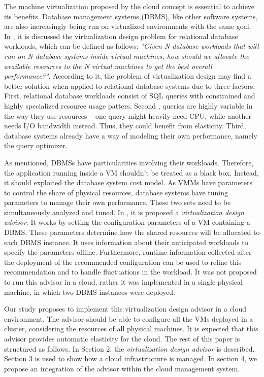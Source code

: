The machine virtualization proposed by the cloud concept is essential to achieve its benefits. Database management systems (DBMS), like other software systems, are also increasingly being run on virtualized environments with the same goal. In \cite{4401021}, it is discussed the virtualization design problem for relational database workloads, which can be defined as follows: \textit{"Given N database workloads that will run on N database systems inside virtual machines, how should we allocate the available resources to the N virtual machines to get the best overall performance?"}. According to it, the problem of virtualization design may find a better solution when applied to relational database systems due to three factors. First, relational database workloads consist of SQL queries with constrained and highly specialized resource usage patters. Second , queries are highly variable in the way they use resources -- one query might heavily need CPU, while another needs I/O bandwidth instead. Thus, they could benefit from elasticity. Third, database systems already have a way of modeling their own performance, namely the query optimizer.

As mentioned, DBMSs have particularities involving their workloads. Therefore, the application running inside a VM shouldn't be treated as a black box. Instead, it should exploited the database system cost model. As VMMs have parameters to control the share of physical resources, database systems have tuning parameters to manage their own performance. These two sets need to be simultaneously analyzed and tuned. In \cite{Soror:2008:AVM:1376616.1376711}, it is proposed a \textit{virtualization design advisor}. It works by setting the configuration parameters of a VM containing a DBMS. These parameters determine how the shared resources will be allocated to each  DBMS instance. It uses information about their anticipated workloads to specify the parameters offline. Furthermore, runtime information collected after the deployment of the recommended configuration can be used to refine this recommendation and to handle fluctuations in the workload. It was not proposed to run this advisor in a cloud, rather it was implemented in a single physical machine, in which two DBMS instances were deployed.

Our study proposes to implement this virtualization design advisor in a cloud environment. The advisor should be able to configure all the VMs deployed in a cluster, considering the resources of all physical machines. It is expected that this advisor provides automatic elasticity for the cloud. The rest of this paper is structured as follows. In Section 2, the \textit{virtualization design advisor} is described. Section 3 is used to show how a cloud infrastructure is managed. In section 4, we propose an integration of the advisor within the cloud management system.

